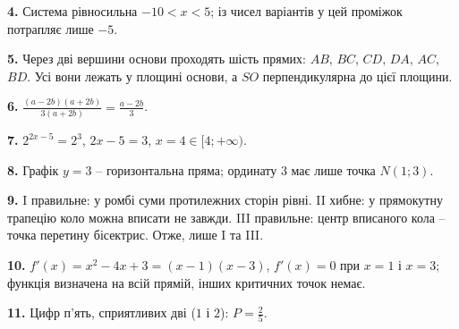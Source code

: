 \documentclass[12pt]{article}
\begin{document}
\par\noindent\textbf{4.} Система рівносильна $-10<x<5$; із чисел варіантів у цей проміжок потрапляє лише $-5$.\par\nopagebreak

\par\noindent\textbf{5.} Через дві вершини основи проходять шість прямих: $AB$, $BC$, $CD$, $DA$, $AC$, $BD$. Усі вони лежать у площині основи, а $SO$ перпендикулярна до цієї площини.\par\nopagebreak

\par\noindent\textbf{6.} $\frac{(a-2b)(a+2b)}{3(a+2b)}=\frac{a-2b}{3}$.\par\nopagebreak

\par\noindent\textbf{7.} $2^{2x-5}=2^3$, $2x-5=3$, $x=4\in[4;+\infty)$.\par\nopagebreak

\par\noindent\textbf{8.} Графік $y=3$ -- горизонтальна пряма; ординату $3$ має лише точка $N(1;3)$.\par\nopagebreak

\par\noindent\textbf{9.} I правильне: у ромбі суми протилежних сторін рівні. II хибне: у прямокутну трапецію коло можна вписати не завжди. III правильне: центр вписаного кола -- точка перетину бісектрис. Отже, лише I та III.\par\nopagebreak

\par\noindent\textbf{10.} $f'(x)=x^2-4x+3=(x-1)(x-3)$, $f'(x)=0$ при $x=1$ і $x=3$; функція визначена на всій прямій, інших критичних точок немає.\par\nopagebreak

\par\noindent\textbf{11.} Цифр п'ять, сприятливих дві ($1$ і $2$): $P=\frac25$.\par\nopagebreak
\end{document}
